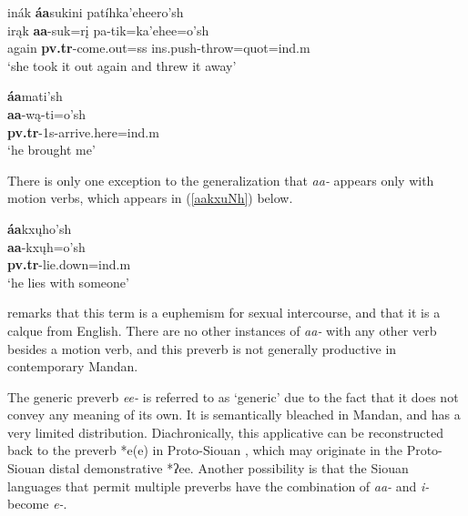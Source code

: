 \begin{exe}
\begin{xlist}
\item \glll inák \textbf{áa}sukini patíhka'eheero'sh\\
	irąk \textbf{aa}-suk=rį pa-tik=ka'ehee=o'sh\\
	\textnormal{again} \textbf{pv.tr}-\textnormal{come.out}=ss ins.push-\textnormal{throw}=quot=ind.m\\
	\glt 	`she took it out again and threw it away' \citep[122]{hollow1973a}
	
\item \glll \textbf{áa}mati'sh\\
	\textbf{aa}-wą-ti=o'sh\\
	\textbf{pv.tr}-1s-\textnormal{arrive.here}=ind.m\\
	\glt `he brought me' \citep[13]{kennard1936}

\end{xlist}

\end{exe}

There is only one exception to the generalization that \textit{aa-} appears only with motion verbs, which appears in (\ref{aakxuNh}) below.

\begin{exe}
\item\label{aakxuNh} \glll \textbf{áa}kxųho'sh\\
	\textbf{aa}-kxųh=o'sh\\
	\textbf{pv.tr}-\textnormal{lie.down}=ind.m\\
	\glt `he lies with someone' \citep[127]{hollow1970}

\end{exe}

\citet[429]{hollow1970} remarks that this term is a euphemism for sexual intercourse, and that it is a calque from English. There are no other instances of \textit{aa-} with any other verb besides a motion verb, and this preverb is not generally productive in contemporary Mandan.

\label{SubParaGeneric}

The generic preverb \textit{ee-} is referred to as `generic' due to the fact that it does not convey any meaning of its own. It is semantically bleached in Mandan, and has a very limited distribution. Diachronically, this applicative can be reconstructed back to the preverb *e(e) in Proto-Siouan \citep{rankin2015}, which may originate in the Proto-Siouan distal demonstrative *ʔee. Another possibility is that the Siouan languages that permit multiple preverbs have the combination of \textit{aa-} and \textit{i-} become \textit{e-}.


